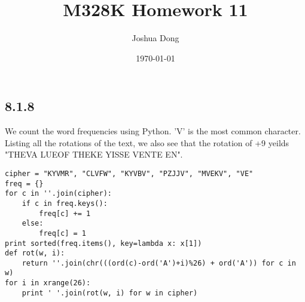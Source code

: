 \documentclass{article}
\begin{document}
\title{M328K\: Homework 11}
\author{Joshua Dong}
\date{\today}
\maketitle

\subsection{8.1.8}
We count the word frequencies using Python. 'V' is the most common character. Listing all the rotations of the text, we also see that the rotation of +9 yeilds "THEVA LUEOF THEKE YISSE VENTE EN".
\\
\begin{lstlisting}
cipher = "KYVMR", "CLVFW", "KYVBV", "PZJJV", "MVEKV", "VE"
freq = {}
for c in ''.join(cipher):
    if c in freq.keys():
        freq[c] += 1
    else:
        freq[c] = 1 
print sorted(freq.items(), key=lambda x: x[1])
def rot(w, i): 
    return ''.join(chr(((ord(c)-ord('A')+i)%26) + ord('A')) for c in w)
for i in xrange(26):
    print ' '.join(rot(w, i) for w in cipher)
\end{lstlisting}
\end{document}
